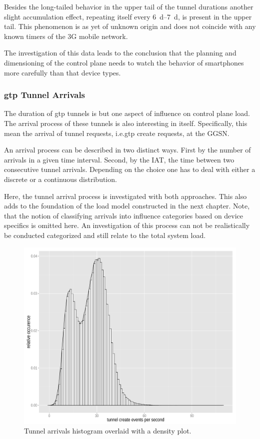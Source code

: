 Besides the long-tailed behavior in the upper tail of the tunnel durations another slight accumulation effect, repeating itself every \SIrange{6}{7}{\day}, is present in the upper tail. This phenomenon is as yet of unknown origin and does not coincide with any known timers of the \gls{3G} mobile network.

The investigation of this data leads to the conclusion that the planning and dimensioning of the control plane needs to watch the behavior of smartphones more carefully than that device types.

\subsubsection{\texorpdfstring{\acrshort{gtp}}{GTP} Tunnel Arrivals}

The duration of \gls{gtp} tunnels is but one aspect of influence on control plane load. The arrival process of these tunnels is also interesting in itself. Specifically, this mean the arrival of tunnel requests, i.e.\gls{gtp} create requests, at the \gls{GGSN}. 

An arrival process can be described in two distinct ways. First by the number of arrivals in a given time interval. Second, by the \gls{IAT}, the time between two consecutive tunnel arrivals. Depending on the choice one has to deal with either a discrete or a continuous distribution.

Here, the tunnel arrival process is investigated with both approaches. This also adds to the foundation of the load model constructed in the next chapter. Note, that the notion of classifying arrivals into influence categories based on device specifics is omitted here. An investigation of this process can not be realistically be conducted categorized and still relate to the total system load.

\begin{figure}[htb]
	\centering
	\includegraphics[width=1.0\textwidth]{images/R-create-frequency.pdf}
	\caption{Tunnel arrivals histogram overlaid with a density plot.}
\label{c4:fig:freq-arrivals}
\end{figure}


